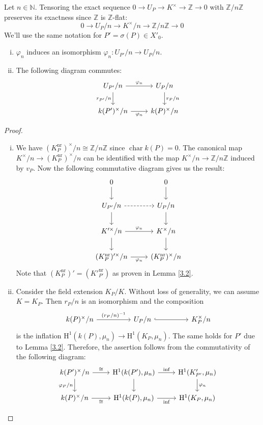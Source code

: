 Let $n\in\mathbb{N}$. Tensoring the exact sequence $0\to U_P\to K^\times \to\mathbb{Z}\to 0$ with $\mathbb{Z}/n\mathbb{Z}$ preserves its exactness since $\mathbb{Z}$ is $\mathbb{Z}$-flat:
\[ 0\longrightarrow U_P/n\longrightarrow K^\times/n\longrightarrow\mathbb{Z}/n\mathbb{Z}\longrightarrow 0 \]
We'll use the same notation for $P' = \sigma(P)\in X'_0$.

\begin{lemma}\label{4.3}
\begin{enumerate}[(i)]
\item $\varphi_n$ induces an isomorphism $\varphi_n: U_{P'}/n\to U_P/n$.
\item The following diagram commutes:
\[ \begin{tikzcd}
U_{P'}/n \rar["\varphi_n"] \dar["r_{P'}/n"'] & U_P/n \dar["r_P/n"]\\
k(P')^\times/n \rar["\varphi_n"'] & k(P)^\times/n
\end{tikzcd} \]
\end{enumerate}
\end{lemma}

\begin{proof}
\begin{enumerate}[(i)]
\item  We have $(K^\text{nr}_P)^\times/n\cong \mathbb{Z}/n\mathbb{Z}$ since $\operatorname{char}k(P) = 0$. The canonical map $K^\times/n \to (K^\text{nr}_P)^\times/n$ can be identified with the map $K^\times /n\to\mathbb{Z}/n\mathbb{Z}$ induced by $v_P$. Now the following commutative diagram gives us the result:
\[ \begin{tikzcd}
0 \ar[d] & 0 \ar[d]\\
U_{P'}/n \ar[r, dashed]\ar[d] & U_P/n\ar[d]\\
K'^\times /n \ar[r, "\varphi_n"]\ar[d] & K^\times/n\ar[d]\\
(K^\text{nr}_P)'^\times /n \ar[r, "\varphi_n"'] &  (K^\text{nr}_P)^\times /n
\end{tikzcd}\]
Note that $(K^\text{nr}_P)' = (K'^{\text{nr}}_{P'})$ as proven in Lemma \ref{3.2}.
\item Consider the field extension $K_P/K$. Without loss of generality, we can assume $K=K_P$. Then $r_P/n$ is an isomorphism and the composition
\[\begin{tikzcd}
k(P)^\times / n\ar[rr, "(r_P/n)^{-1}"] && U_P/n \ar[rr, hook] && K_P^\times/n
\end{tikzcd}\]
is the inflation $\mathrm{H}^1(k(P), \mu_n) \to \mathrm{H}^1(K_P,\mu_n)$. The same holds for $P'$ due to Lemma \ref{3.2}. Therefore, the assertion follows from the commutativity of the following diagram:
\[ \begin{tikzcd}
k(P')^\times/n \ar[r, "\cong"] \ar[d, "\varphi_P/n"'] & \mathrm{H}^1(k(P'),\mu_n) \ar[r, "\mathrm{inf}"] \ar[d]& \mathrm{H}^1(K'_{P'}, \mu_n) \ar[d, "\varphi_n"] \\
k(P)^\times/n \ar[r, "\cong"'] & \mathrm{H}^1(k(P),\mu_n)  \ar[r, "\mathrm{inf}"'] & \mathrm{H}^1(K_{P}, \mu_n)
\end{tikzcd}  \qedhere\]
\end{enumerate}
\end{proof}

